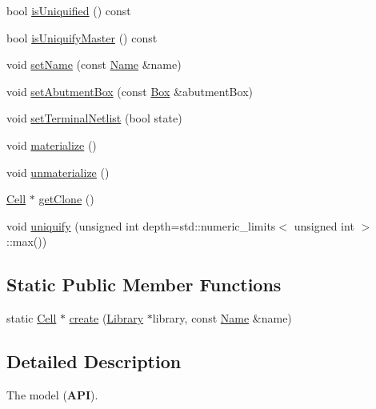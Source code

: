 \begin{DoxyCompactItemize}
bool \mbox{\hyperlink{classHurricane_1_1Cell_a86c21867e9ce896eae72fd2999ce8a2d}{is\+Uniquified}} () const
\item 
bool \mbox{\hyperlink{classHurricane_1_1Cell_a0220dbbbe730e6874f7620135e9c10f6}{is\+Uniquify\+Master}} () const
\item 
void \mbox{\hyperlink{classHurricane_1_1Cell_ad2c9face922062664110c66ee205eab2}{set\+Name}} (const \mbox{\hyperlink{classHurricane_1_1Name}{Name}} \&name)
\item 
void \mbox{\hyperlink{classHurricane_1_1Cell_ab1949e2b708f0bd2d215ab90cfe864e0}{set\+Abutment\+Box}} (const \mbox{\hyperlink{classHurricane_1_1Box}{Box}} \&abutment\+Box)
\item 
void \mbox{\hyperlink{classHurricane_1_1Cell_a47ce34631bb9f6862caa13e5b25a4d8f}{set\+Terminal\+Netlist}} (bool state)
\item 
void \mbox{\hyperlink{classHurricane_1_1Cell_affefc597317063857f4904d4b16d5d4f}{materialize}} ()
\item 
void \mbox{\hyperlink{classHurricane_1_1Cell_a40c9ba4e3fc76b0c4bc58af8dcaddf53}{unmaterialize}} ()
\item 
\mbox{\hyperlink{classHurricane_1_1Cell}{Cell}} $\ast$ \mbox{\hyperlink{classHurricane_1_1Cell_a092f53c7f517ecc70d9ba375296c5d5b}{get\+Clone}} ()
\item 
void \mbox{\hyperlink{classHurricane_1_1Cell_aa113c121813342b6304f3e7fddbc8565}{uniquify}} (unsigned int depth=std\+::numeric\+\_\+limits$<$ unsigned int $>$\+::max())
\end{DoxyCompactItemize}
\subsection*{Static Public Member Functions}
\begin{DoxyCompactItemize}
\item 
static \mbox{\hyperlink{classHurricane_1_1Cell}{Cell}} $\ast$ \mbox{\hyperlink{classHurricane_1_1Cell_ad803afb3e52bea3bf3d520e353b162e0}{create}} (\mbox{\hyperlink{classHurricane_1_1Library}{Library}} $\ast$library, const \mbox{\hyperlink{classHurricane_1_1Name}{Name}} \&name)
\end{DoxyCompactItemize}


\subsection{Detailed Description}
The model ({\bfseries A\+PI}). 

